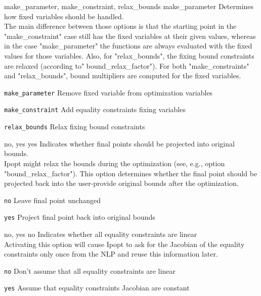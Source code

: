 %
{\ttfamily make\_parameter, make\_constraint, relax\_bounds}%
{make\_parameter}%
{Determines how fixed variables should be handled.\\
The main difference between those options is that the starting point in the "make\_constraint" case still has the fixed variables at their given values, whereas in the case "make\_parameter" the functions are always evaluated with the fixed values for those variables.  Also, for "relax\_bounds", the fixing bound constraints are relaxed (according to" bound\_relax\_factor"). For both "make\_constraints" and "relax\_bounds", bound multipliers are computed for the fixed variables.}%
{\begin{list}{}{
\setlength{\parsep}{0em}
\setlength{\leftmargin}{5ex}
\setlength{\labelwidth}{2ex}
\setlength{\itemindent}{0ex}
\setlength{\topsep}{0pt}}
\item[\texttt{make\_parameter}] Remove fixed variable from optimization variables
\item[\texttt{make\_constraint}] Add equality constraints fixing variables
\item[\texttt{relax\_bounds}] Relax fixing bound constraints
\end{list}
}

%
{\ttfamily no, yes}%
{yes}%
{Indicates whether final points should be projected into original bounds.\\
Ipopt might relax the bounds during the optimization (see, e.g., option "bound\_relax\_factor").  This option determines whether the final point should be projected back into the user-provide original bounds after the optimization.}%
{\begin{list}{}{
\setlength{\parsep}{0em}
\setlength{\leftmargin}{5ex}
\setlength{\labelwidth}{2ex}
\setlength{\itemindent}{0ex}
\setlength{\topsep}{0pt}}
\item[\texttt{no}] Leave final point unchanged
\item[\texttt{yes}] Project final point back into original bounds
\end{list}
}

%
{\ttfamily no, yes}%
{no}%
{Indicates whether all equality constraints are linear\\
Activating this option will cause Ipopt to ask for the Jacobian of the equality constraints only once from the NLP and reuse this information later.}%
{\begin{list}{}{
\setlength{\parsep}{0em}
\setlength{\leftmargin}{5ex}
\setlength{\labelwidth}{2ex}
\setlength{\itemindent}{0ex}
\setlength{\topsep}{0pt}}
\item[\texttt{no}] Don't assume that all equality constraints are linear
\item[\texttt{yes}] Assume that equality constraints Jacobian are constant
\end{list}
}


